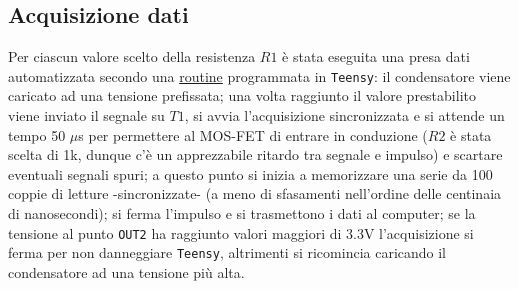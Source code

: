 \documentclass{article}[a4paper, oneside, 11pt]
\begin{document}
\subsection{Acquisizione dati}
Per ciascun valore scelto della resistenza $R1$ è stata eseguita una presa dati 
automatizzata secondo una \href{https://github.com/LucaCiucci/relaz_seme/blob/master/sketches/teensy_differenziale_definitivo/teensy_differenziale_definitivo.ino}{routine} programmata in \verb+Teensy+: il condensatore 
viene caricato ad una tensione prefissata; una volta raggiunto il valore 
prestabilito viene inviato il segnale su $T1$, si avvia l'acquisizione 
sincronizzata e si attende un tempo 50 $\mu$s per permettere al MOS-FET di 
entrare in conduzione ($R2$ è stata scelta di 1k, dunque c'è un apprezzabile 
ritardo tra segnale e impulso) e scartare eventuali segnali spuri; a questo 
punto si inizia a memorizzare una serie da 100 coppie di letture 
-sincronizzate- (a meno di sfasamenti nell'ordine delle centinaia di 
nanosecondi); si ferma l'impulso e si trasmettono i dati al computer; se la 
tensione al punto \verb+OUT2+ ha raggiunto valori maggiori di 3.3V l'acquisizione si ferma
per non danneggiare \verb+Teensy+, altrimenti si ricomincia caricando il
condensatore ad una tensione più alta.

\end{document}
